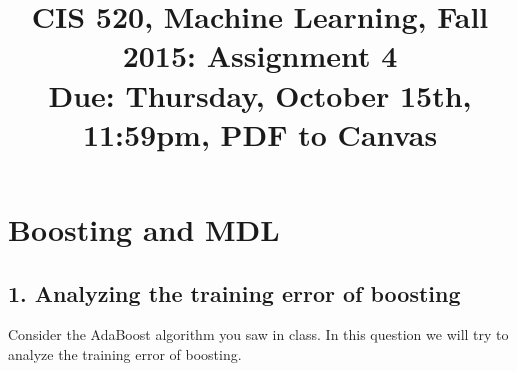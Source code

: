 \documentclass[english]{article}
\title{CIS 520, Machine Learning, Fall 2015: Assignment 4 \\
Due: Thursday, October 15th, 11:59pm, PDF to Canvas\\}
\date{}
\begin{document}
\maketitle

\section*{Boosting and MDL}
\label{sec:boosting}

\subsection*{1. Analyzing the training error of boosting}

Consider the AdaBoost algorithm you saw in class. In this question
we will try to analyze the training error of boosting.
\end{document}
